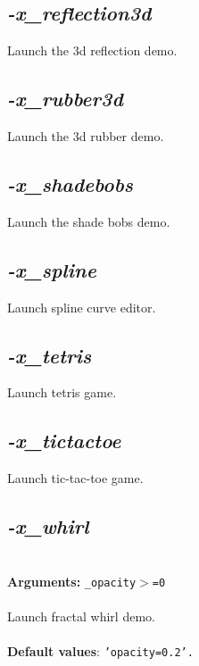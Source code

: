 \documentclass[a4paper,11pt,twoside]{book}
\begin{document}
\subsection{\emph{-x\_reflection3d} }\vspace*{-0.5em}
Launch the 3d reflection demo.


\subsection{\emph{-x\_rubber3d} }\vspace*{-0.5em}
Launch the 3d rubber demo.


\subsection{\emph{-x\_shadebobs} }\vspace*{-0.5em}
Launch the shade bobs demo.


\subsection{\emph{-x\_spline} }\vspace*{-0.5em}
Launch spline curve editor.


\subsection{\emph{-x\_tetris} }\vspace*{-0.5em}
Launch tetris game.


\subsection{\emph{-x\_tictactoe} }\vspace*{-0.5em}
Launch tic-tac-toe game.


\subsection{\emph{-x\_whirl} }\vspace*{-0.5em}
~\\\textbf{Arguments: } 
{\small \texttt{\_opacity$>$=0}}\\~\\
Launch fractal whirl demo.
~\\~\\\textbf{Default values}: {\small \texttt{'opacity=0.2'.}}
\end{document}
